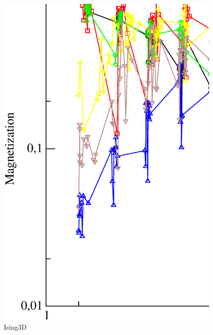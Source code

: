 \begin{figure}[!htpb]
  \centering
  \includegraphics[width=15cm]{./plots/Ising3D/Equilibration time study.eps}
  \caption{Ising3D}
\end{figure}

